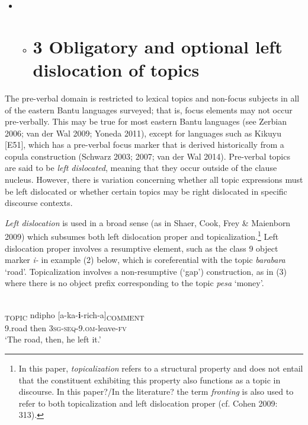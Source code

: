\documentclass[output=paper]{langsci/langscibook}
\begin{document}
\begin{itemize}
\item \begin{itemize}
\item \chapter{3  Obligatory and optional left dislocation of topics}\end{itemize}
\end{itemize}

The pre-verbal domain is restricted to lexical topics and non-focus subjects in all of the eastern Bantu languages surveyed; that is, focus elements may not occur pre-verbally. This may be true for most eastern Bantu languages (see Zerbian 2006; van der Wal 2009; Yoneda 2011), except for languages such as Kikuyu [E51], which has a pre-verbal focus marker that is derived historically from a copula construction (Schwarz 2003; 2007; van der Wal 2014). Pre-verbal topics are said to be \textit{left dislocated}, meaning that they occur outside of the clause nucleus. However, there is variation concerning whether all topic expressions must be left dislocated or whether certain topics may be right dislocated in specific discourse contexts.

\textit{Left dislocation} is used in a broad sense (as in Shaer, Cook, Frey \& Maienborn 2009) which subsumes both left dislocation proper and topicalization.\footnote{In this paper, \textit{topicalizat}\textit{ion} refers to a structural property and does not entail that the constituent exhibiting this property also functions as a topic in discourse. In this paper?/In the literature? the term \textit{fronting} is also used to refer to both topicalization and left dislocation proper (cf. Cohen 2009: 313).} Left dislocation proper involves a resumptive element, such as the class 9 object marker \textit{i}\textit{\nobreakdash-} in example (2) below, which is coreferential with the topic \textit{barabara} ‘road’. Topicalization involves a non-resumptive (‘gap’) construction, as in (3) where there is no object prefix corresponding to the topic \textit{pesa} ‘money’.

\ea\label{ex:}
\\
\gll [Barabara]\textsubscript{TOPIC} ndipho [a-ka-\textbf{i}{}-rich-a]\textsubscript{COMMENT}\\
     9.road then \textsc{3sg-seq}{}-9.\textsc{om}{}-leave-\textsc{fv}\\
\glt \textup{‘}\textup{The road, then, he left it.’}
\z
\end{document}
